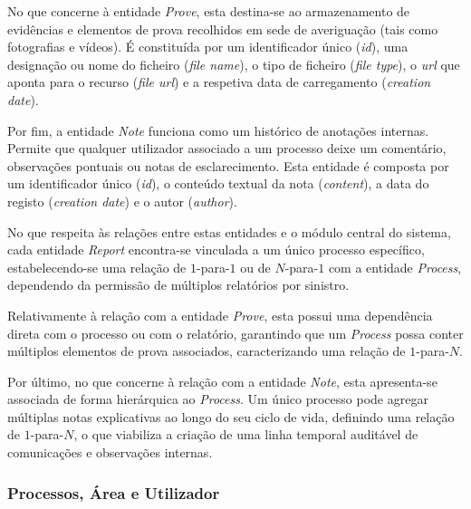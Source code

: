No que concerne à entidade \textit{Prove}, esta destina-se ao armazenamento de evidências e elementos de prova recolhidos em sede de averiguação (tais como fotografias e vídeos). É constituída por um identificador único (\textit{id}), uma designação ou nome do ficheiro (\textit{file name}), o tipo de ficheiro (\textit{file type}), o \textit{url} que aponta para o recurso (\textit{file url}) e a respetiva data de carregamento (\textit{creation date}).

Por fim, a entidade \textit{Note} funciona como um histórico de anotações internas. Permite que qualquer utilizador associado a um processo deixe um comentário, observações pontuais ou notas de esclarecimento. Esta entidade é composta por um identificador único (\textit{id}), o conteúdo textual da nota (\textit{content}), a data do registo (\textit{creation date}) e o autor (\textit{author}).

No que respeita às relações entre estas entidades e o módulo central do sistema, cada entidade \textit{Report} encontra-se vinculada a um único processo específico, estabelecendo-se uma relação de $1$-para-$1$ ou de $N$-para-$1$ com a entidade \textit{Process}, dependendo da permissão de múltiplos relatórios por sinistro.

Relativamente à relação com a entidade \textit{Prove}, esta possui uma dependência direta com o processo ou com o relatório, garantindo que um \textit{Process} possa conter múltiplos elementos de prova associados, caracterizando uma relação de $1$-para-$N$.

Por último, no que concerne à relação com a entidade \textit{Note}, esta apresenta-se associada de forma hierárquica ao \textit{Process}. Um único processo pode agregar múltiplas notas explicativas ao longo do seu ciclo de vida, definindo uma relação de $1$-para-$N$, o que viabiliza a criação de uma linha temporal auditável de comunicações e observações internas.


\subsubsection{Processos, Área e Utilizador}

